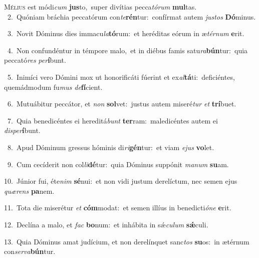 \lettrine{\initial\textcolor{\initialcolor}{M}}{élius} est módi\textit{cum} \textbf{jus}\-to,~\star super divítias pecca\-\textit{tó}\-\textit{rum} \textbf{mul}\-tas.\\
{\numbfont\textcolor{\numbcolor}{~2.}}~Quóniam bráchia peccatórum con\-\textit{te}\-\textbf{rén}tur:~\star confírmat autem \textit{jus}\-\textit{tos} \textbf{Dó}\-minus.\par
{\numbfont\textcolor{\numbcolor}{~3.}}~Novit Dóminus dies immacu\-\textit{la}\-\textbf{tó}rum:~\star et heréditas eórum in æ\-\textit{tér}\-\textit{num} \textbf{e}\-rit.\par
{\numbfont\textcolor{\numbcolor}{~4.}}~Non confundéntur in témpore malo,~\dagger et in diébus famis satu\-\textit{ra}\-\textbf{bún}tur:~\star quia peccató\textit{res} \textit{per}\-\textbf{í}bunt.\par
{\numbfont\textcolor{\numbcolor}{~5.}}~Inimíci vero Dómini mox ut honorificáti fúerint et ex\-\textit{al}\-\textbf{tá}ti:~\star deficiéntes, quemádmodum fu\textit{mus} \textit{de}\-\textbf{fí}cient.\par
{\numbfont\textcolor{\numbcolor}{~6.}}~Mutuábitur peccátor, et \textit{non} \textbf{sol}\-vet:~\star justus autem miseré\textit{tur} \textit{et} \textbf{trí}\-buet.\par
{\numbfont\textcolor{\numbcolor}{~7.}}~Quia benedicéntes ei hereditá\textit{bunt} \textbf{ter}\-ram:~\star maledicéntes autem ei \textit{dis}\-\textit{per}\textbf{í}bunt.\par
{\numbfont\textcolor{\numbcolor}{~8.}}~Apud Dóminum gressus hóminis di\-\textit{ri}\-\textbf{gén}tur:~\star et viam \textit{e}\-\textit{jus} \textbf{vo}\-let.\par
{\numbfont\textcolor{\numbcolor}{~9.}}~Cum cecíderit non col\-\textit{li}\-\textbf{dé}tur:~\star quia Dóminus suppónit \textit{ma}\-\textit{num} \textbf{su}\-am.\par
{\numbfont\textcolor{\numbcolor}{10.}}~Júnior fui, éte\textit{nim} \textbf{sé}\-nui:~\star et non vidi justum derelíctum, nec semen ejus \textit{quæ}\-\textit{rens} \textbf{pa}\-nem.\par
{\numbfont\textcolor{\numbcolor}{11.}}~Tota die miserétur \textit{et} \textbf{cóm}\-modat:~\star et semen illíus in benedicti\-\textit{ó}\-\textit{ne} \textbf{e}\-rit.\par
{\numbfont\textcolor{\numbcolor}{12.}}~Declína a malo, et \textit{fac} \textbf{bo}\-num:~\star et inhábita in sǽ\-\textit{cu}\-\textit{lum} \textbf{sǽ}\-culi.\par
{\numbfont\textcolor{\numbcolor}{13.}}~Quia Dóminus amat judícium, et non derelínquet sanc\textit{tos} \textbf{su}\-os:~\star in ætérnum con\-\textit{ser}\-\textit{va}\textbf{bún}tur.\par
